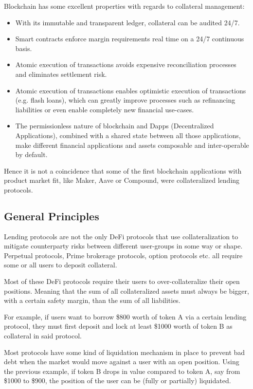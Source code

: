 \documentclass[sigconf,nonacm]{acmart}
\begin{document}
Blockchain has some excellent properties with regards to collateral management:
\begin{itemize}
    \item With its immutable and transparent ledger, collateral can be audited 24/7.
    \item Smart contracts enforce margin requirements real time on a 24/7 continuous basis.
    \item Atomic execution of transactions avoids expensive reconciliation processes and eliminates settlement risk.
    \item Atomic execution of transactions enables optimistic execution of transactions (e.g. flash loans),
    which can greatly improve processes such as refinancing liabilities or even enable completely new financial use-cases.
    \item The permissionless nature of blockchain and Dapps (Decentralized Applications),
    combined with a shared state between all those applications,
    make different financial applications and assets composable and inter-operable by default.
\end{itemize}

Hence it is not a coincidence that some of the first blockchain applications with product market fit, 
like Maker\cite{team2017dai}, Aave\cite{thornburg2020aave} or Compound\cite{leshner2019compound},
were collateralized lending protocols.

\subsection{General Principles}
Lending protocols are not the only DeFi protocols that use collateralization to mitigate counterparty risks between different user-groups in some way or shape.
Perpetual protocols, Prime brokerage protocols, option protocols etc. all require some or all users to deposit collateral.

Most of these DeFi protocols require their users to over-collateralize their open positions.
Meaning that the sum of all collateralized assets must always be bigger, with a certain safety margin, than the sum of all liabilities.

For example, if users want to borrow \$800 worth of token A via a certain lending protocol,
they must first deposit and lock at least \$1000 worth of token B as collateral in said protocol.

Most protocols have some kind of liquidation mechanism in place to prevent bad debt when the market would move against a user with an open position.
Using the previous example, if token B drops in value compared to token A, say from \$1000 to \$900,
the position of the user can be (fully or partially) liquidated.
\end{document}
